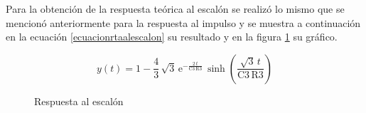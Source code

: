 







Para la obtención de la respuesta teórica al escalón se realizó lo mismo que se mencionó anteriormente para la respuesta al impulso y se muestra a continuación en la ecuación \ref{ecuacionrtaalescalon} su resultado y en la figura \ref{respuestaalescalon} su gráfico.

\begin{equation}
y \! \left(t\right) = 1 - \dfrac{4}{3}\, \sqrt{3}\, \mathrm{e}^{-\frac{2\, t}{\mathrm{C3}\, \mathrm{R3}}}\, \sinh\!\left(\dfrac{\sqrt{3}\, t}{\mathrm{C3}\, \mathrm{R3}}\right)
\label{ecuacionrtaalescalon}
\end{equation}

\begin{figure}[H] 
\begin{center}
\caption{Respuesta al escalón}
\label{respuestaalescalon}
\end{center}
\end{figure}

